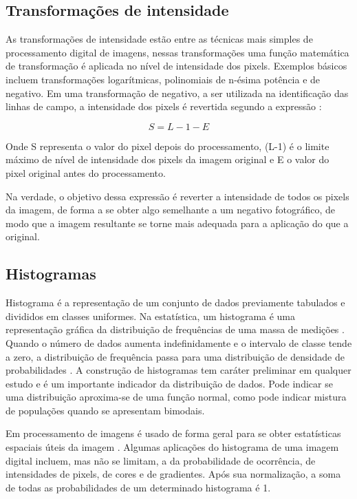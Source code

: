 \subsection{Transformações de intensidade}

As transformações de intensidade estão entre as técnicas mais simples de processamento digital de imagens, nessas transformações uma função matemática de transformação é aplicada no nível de intensidade dos pixels. Exemplos básicos incluem transformações logarítmicas, polinomiais de n-ésima potência e de negativo. Em uma transformação de negativo, a ser utilizada na identificação das linhas de campo, a intensidade dos pixels é revertida segundo a expressão \cite{Gonzalez}:

\begin{equation}
	S = L-1-E 
\end{equation}

Onde S representa o valor do pixel depois do processamento, (L-1) é o limite máximo de nível de intensidade dos pixels da imagem original e E o valor do pixel original antes do processamento.

Na verdade, o objetivo dessa expressão é reverter a intensidade de todos os pixels da imagem, de forma a se obter algo semelhante a um negativo fotográfico, de modo que a imagem resultante se torne mais adequada para a aplicação do que a original.

\subsection{Histogramas}

Histograma é a representação de um conjunto de dados previamente tabulados e divididos em classes uniformes. Na estatística, um histograma é uma representação gráfica da distribuição de frequências de uma massa de medições \cite{Wand}. Quando o número de dados aumenta indefinidamente e o intervalo de classe tende a zero, a distribuição de frequência passa para uma distribuição de densidade de probabilidades \cite{Wand}. A construção de histogramas tem caráter preliminar em qualquer estudo e é um importante indicador da distribuição de dados. Pode indicar se uma distribuição aproxima-se de uma função normal, como pode indicar mistura de populações quando se apresentam bimodais. \cite{Wand}

Em processamento de imagens é usado de forma geral para se obter estatísticas espaciais úteis da imagem \cite{Gonzalez}. Algumas aplicações do histograma de uma imagem digital incluem, mas não se limitam, a da probabilidade de ocorrência, de intensidades de pixels, de cores e de gradientes. Após sua normalização, a soma de todas as probabilidades de um determinado histograma é 1. 

